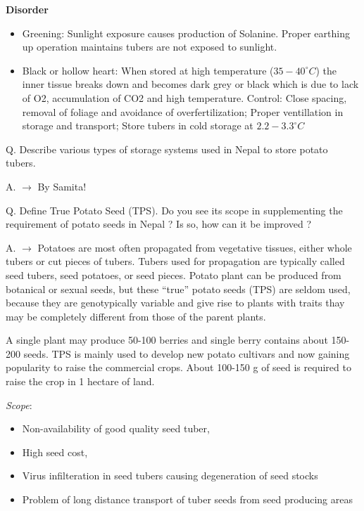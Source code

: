 \documentclass[
  openany]{book}
\providecommand{\tightlist}{%
  \setlength{\itemsep}{0pt}\setlength{\parskip}{0pt}}
\begin{document}
\textbf{Disorder}

\begin{itemize}
\tightlist
\item
  Greening: Sunlight exposure causes production of Solanine. Proper earthing up operation maintains tubers are not exposed to sunlight.
\item
  Black or hollow heart: When stored at high temperature (\(35-40^\circ C\)) the inner tissue breaks down and becomes dark grey or black which is due to lack of O2, accumulation of CO2 and high temperature. Control: Close spacing, removal of foliage and avoidance of overfertilization; Proper ventillation in storage and transport; Store tubers in cold storage at \(2.2-3.3^\circ C\)
\end{itemize}

Q. Describe various types of storage systems used in Nepal to store potato tubers.

A. \(\longrightarrow\) By Samita!

Q. Define True Potato Seed (TPS). Do you see its scope in supplementing the requirement of potato seeds in Nepal ? Is so, how can it be improved ?

A. \(\longrightarrow\) Potatoes are most often propagated from vegetative tissues, either whole tubers or cut pieces of tubers. Tubers used for propagation are typically called seed tubers, seed potatoes, or seed pieces. Potato plant can be produced from botanical or sexual seeds, but these ``true'' potato seeds (TPS) are seldom used, because they are genotypically variable and give rise to plants with traits thay may be completely different from those of the parent plants.

A single plant may produce 50-100 berries and single berry contains about 150-200 seeds. TPS is mainly used to develop new potato cultivars and now gaining popularity to raise the commercial crops. About 100-150 g of seed is required to raise the crop in 1 hectare of land.

\emph{Scope}:

\begin{itemize}
\tightlist
\item
  Non-availability of good quality seed tuber,
\item
  High seed cost,
\item
  Virus infilteration in seed tubers causing degeneration of seed stocks
\item
  Problem of long distance transport of tuber seeds from seed producing areas
\end{itemize}
\end{document}
